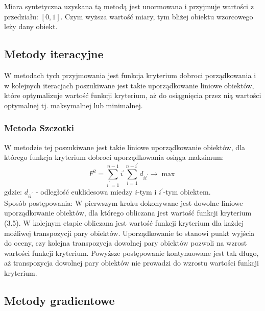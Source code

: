 \documentclass[12pt,a4paper]{report}
\begin{document}
Miara syntetyczna uzyskana tą metodą jest unormowana i przyjmuje wartości z przedziału: $[0,1]$. Czym wyższa wartość miary, tym bliżej obiektu wzorcowego leży dany obiekt. 

\subsection{Metody iteracyjne}
\noindent

W metodach tych przyjmowania jest funkcja kryterium dobroci porządkowania i w kolejnych iteracjach poszukiwane jest takie uporządkowanie liniowe obiektów, które optymalizuje wartość funkcji kryterium, aż do osiągnięcia przez nią wartości optymalnej tj. maksymalnej lub minimalnej. 


\subsubsection{Metoda Szczotki}
\noindent

W metodzie tej poszukiwane jest  takie liniowe uporządkowanie obiektów, dla którego funkcja kryterium dobroci uporządkowania osiąga maksimum:
\begin{equation}
F^{2}=\sum_{i^{'}=1}^{n-1} i^{'}\sum_{i=1}^{n-i^{'}} d_{ii^{'}} \rightarrow     \max  
\end{equation}
gdzie:
\newline
$d_{ii^{'}}$ - odległość euklidesowa miedzy $i$-tym i $i^{'}$-tym obiektem.\\
Sposób postępowania:
\newline
W pierwszym kroku dokonywane jest dowolne liniowe uporządkowanie obiektów, dla którego obliczana jest wartość funkcji kryterium (3.5). W kolejnym etapie obliczana jest wartość funkcji kryterium dla każdej możliwej transpozycji pary obiektów.
Uporządkowanie to stanowi punkt wyjścia do oceny, czy kolejna transpozycja dowolnej pary obiektów pozwoli na wzrost wartości funkcji kryterium. Powyższe postępowanie kontynuowane jest tak długo, aż transpozycja dowolnej pary obiektów nie prowadzi do wzrostu wartości funkcji kryterium. 


\subsection{Metody gradientowe} %
\noindent
\end{document}
